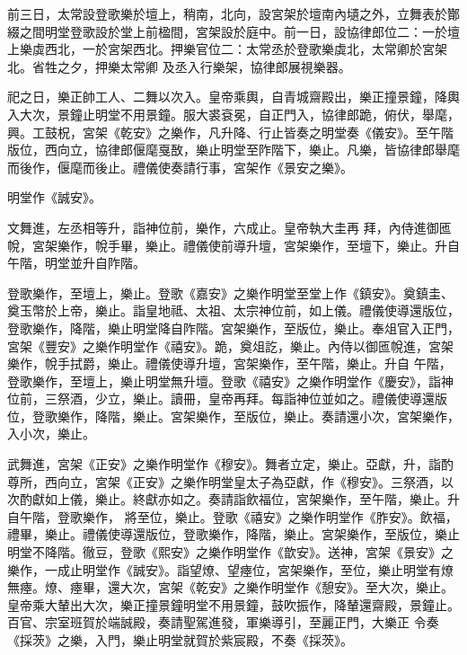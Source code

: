\begin{pinyinscope}
 前三日，太常設登歌樂於壇上，稍南，北向，設宮架於壇南內壝之外，立舞表於酇綴之間明堂登歌設於堂上前楹間，宮架設於庭中。前一日，設協律郎位二：一於壇上樂虡西北，一於宮架西北。押樂官位二：太常丞於登歌樂虡北，太常卿於宮架北。省牲之夕，押樂太常卿
 及丞入行樂架，協律郎展視樂器。



 祀之日，樂正帥工人、二舞以次入。皇帝乘輿，自青城齋殿出，樂正撞景鐘，降輿入大次，景鐘止明堂不用景鐘。服大裘袞冕，自正門入，協律郎跪，俯伏，舉麾，興。工鼓柷，宮架《乾安》之樂作，凡升降、行止皆奏之明堂奏《儀安》。至午階版位，西向立，協律郎偃麾戛敔，樂止明堂至阼階下，樂止。凡樂，皆協律郎舉麾而後作，偃麾而後止。禮儀使奏請行事，宮架作《景安之樂》。



 明堂作《誠安》。



 文舞進，左丞相等升，詣神位前，樂作，六成止。皇帝執大圭再
 拜，內侍進御匜帨，宮架樂作，帨手畢，樂止。禮儀使前導升壇，宮架樂作，至壇下，樂止。升自午階，明堂並升自阼階。



 登歌樂作，至壇上，樂止。登歌《嘉安》之樂作明堂至堂上作《鎮安》。奠鎮圭、奠玉幣於上帝，樂止。詣皇地祗、太祖、太宗神位前，如上儀。禮儀使導還版位，登歌樂作，降階，樂止明堂降自阼階。宮架樂作，至版位，樂止。奉俎官入正門，宮架《豐安》之樂作明堂作《禧安》。跪，奠俎訖，樂止。內侍以御匜帨進，宮架樂作，帨手拭爵，樂止。禮儀使導升壇，宮架樂作，至午階，樂止。升自
 午階，登歌樂作，至壇上，樂止明堂無升壇。登歌《禧安》之樂作明堂作《慶安》，詣神位前，三祭酒，少立，樂止。讀冊，皇帝再拜。每詣神位並如之。禮儀使導還版位，登歌樂作，降階，樂止。宮架樂作，至版位，樂止。奏請還小次，宮架樂作，入小次，樂止。



 武舞進，宮架《正安》之樂作明堂作《穆安》。舞者立定，樂止。亞獻，升，詣酌尊所，西向立，宮架《正安》之樂作明堂皇太子為亞獻，作《穆安》。三祭酒，以次酌獻如上儀，樂止。終獻亦如之。奏請詣飲福位，宮架樂作，至午階，樂止。升自午階，登歌樂作，
 將至位，樂止。登歌《禧安》之樂作明堂作《胙安》。飲福，禮畢，樂止。禮儀使導還版位，登歌樂作，降階，樂止。宮架樂作，至版位，樂止明堂不降階。徹豆，登歌《熙安》之樂作明堂作《歆安》。送神，宮架《景安》之樂作，一成止明堂作《誠安》。詣望燎、望瘞位，宮架樂作，至位，樂止明堂有燎無瘞。燎、瘞畢，還大次，宮架《乾安》之樂作明堂作《憩安》。至大次，樂止。皇帝乘大輦出大次，樂正撞景鐘明堂不用景鐘，鼓吹振作，降輦還齋殿，景鐘止。百官、宗室班賀於端誠殿，奏請聖駕進發，軍樂導引，至麗正門，大樂正
 令奏《採茨》之樂，入門，樂止明堂就賀於紫宸殿，不奏《採茨》。




\end{pinyinscope}
